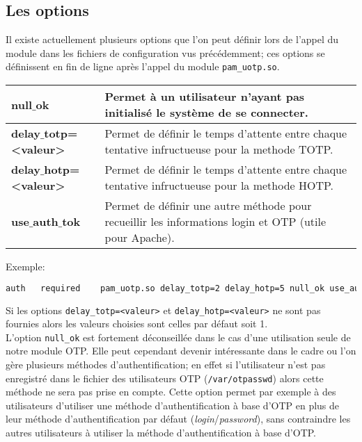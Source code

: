 \documentclass{"../../../res/univ-projet"}
\begin{document}
\subsection{Les options}
Il existe actuellement plusieurs options que l'on peut définir lors de l'appel du module
dans les fichiers de configuration vus précédemment; ces options se définissent en fin de 
ligne après l'appel du module \verb?pam_uotp.so?.
\newline
\begin{tabular}{|p{}p{}|}
\hline
\textbf{null$\_$ok} & Permet à un utilisateur n'ayant pas initialisé le système de se connecter.\\
\hline
\textbf{delay$\_$totp=<valeur>} & Permet de définir le temps d'attente entre 
chaque tentative infructueuse pour la methode TOTP.\\
\hline
\textbf{delay$\_$hotp=<valeur>} & Permet de définir le temps d'attente entre 
chaque tentative infructueuse pour la methode HOTP.\\
\hline
\textbf{use$\_$auth$\_$tok} & Permet de définir une autre méthode pour recueillir 
les informations login et OTP (utile pour Apache).\\
\hline
\end{tabular}
Exemple:
\begin{lstlisting}[language=bash, backgroundcolor=\color{black}, basicstyle=\color{white}]
auth   required    pam_uotp.so delay_totp=2 delay_hotp=5 null_ok use_auth_tok
\end{lstlisting}

Si les options \verb?delay_totp=<valeur>? et \verb?delay_hotp=<valeur>? ne sont pas fournies alors
les valeurs choisies sont celles par défaut soit 1.\\
L'option \verb?null_ok? est fortement déconseillée dans le cas d'une utilisation seule de notre module OTP.
Elle peut cependant devenir intéressante dans le cadre ou l'on gère plusieurs méthodes d'authentification;
en effet si l'utilisateur n'est pas enregistré dans le fichier des utilisateurs OTP (\verb?/var/otpasswd?)
alors cette méthode ne sera pas prise en compte. Cette option permet par exemple à des utilisateurs d'utiliser
une méthode d'authentification à base d'OTP en plus de leur méthode d'authentification par défaut 
(\textit{login}/\textit{password}), sans contraindre les autres utilisateurs à utiliser la 
méthode d'authentification à base d'OTP.\\
\end{document}
